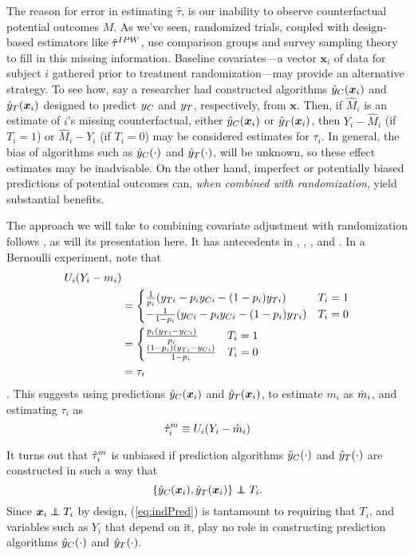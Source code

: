 The reason for error in estimating $\hat{\tau}$, is our inability to observe counterfactual
potential outcomes $M$.
As we've seen, randomized trials, coupled with design-based estimators
like $\hat{\tau}^{IPW}$, use comparison groups and survey sampling theory to
fill in this missing information.
Baseline covariates---a vector $\bm{x}_i$ of data for subject $i$
gathered prior to treatment randomization---may provide an alternative
strategy.
To see how, say a researcher had constructed algorithms $\hat{y}_C(\bm{x}_i)$ and
$\hat{y}_T(\bm{x}_i)$ designed to predict $y_C$ and $y_T$, respectively, from
$\bm{x}$.
Then, if $\hat{M}_i$ is an estimate of $i$'s missing counterfactual,
either $\hat{y}_C(\bm{x}_i)$ or $\hat{y}_T(\bm{x}_i)$, then $Y_i-\hat{M}_i$ (if $T_i=1$) or $\hat{M}_i-Y_i$ (if $T_i=0$)
may be considered estimates for $\tau_i$.
In general, the bias of algorithms such as $\hat{y}_C(\cdot)$ and
$\hat{y}_T(\cdot)$, will be unknown, so these effect estimates may be inadvisable.
On the other hand, imperfect or potentially biased predictions of
potential outcomes can, \emph{when combined with randomization}, yield
substantial benefits.

The approach we will take to combining covariate adjustment with
randomization follows \citet{loop}, as will its presentation here.
It has antecedents in \citet{rosenbaum2002covariance},
\citet{aronowMiddleton}, \citet{wager2016high}, and \citet{tame}.
In a Bernoulli experiment, note that
\begin{align*}
U_i(Y_i-m_i)&\\
&=\begin{cases}
\frac{1}{p_i}(y_{Ti}-p_iy_{Ci}-(1-p_i)y_{Ti})&T_i=1\\
-\frac{1}{1-p_i}(y_{Ci}-p_iy_{Ci}-(1-p_i)y_{Ti})&T_i=0 \end{cases}\\
&=\begin{cases}
\frac{p_i(y_{Ti}-y_{Ci})}{p_i}&T_i=1\\
\frac{(1-p_i)(y_{Ti}-y_{Ci})}{1-p_i}&T_i=0
\end{cases}\\
&=\tau_i
\end{align*}.
This suggests using predictions $\hat{y}_C(\bm{x}_i)$ and $\hat{y}_T(\bm{x}_i)$, to estimate $m_i$ as
$\hat{m}_i$,
and estimating $\tau_i$ as
\begin{equation*}
\hat{\tau}_i^m\equiv U_i(Y_i-\hat{m}_i)
\end{equation*}

It turns out that $\hat{\tau}_i^m$ is unbiased if prediction algorithms $\hat{y}_C(\cdot)$ and $\hat{y}_T(\cdot)$
are constructed in such a way that
\begin{equation}\label{eq:indPred}
\{\predcx,\predtx\}\independent T_i.
\end{equation}
Since $\bm{x}_i\independent T_i$ by design, (\ref{eq:indPred}) is
tantamount to requiring that $T_i$, and variables such as $Y_i$ that
depend on it, play no role in constructing prediction algorithms $\hat{y}_C(\cdot)$ and
$\hat{y}_T(\cdot)$.

